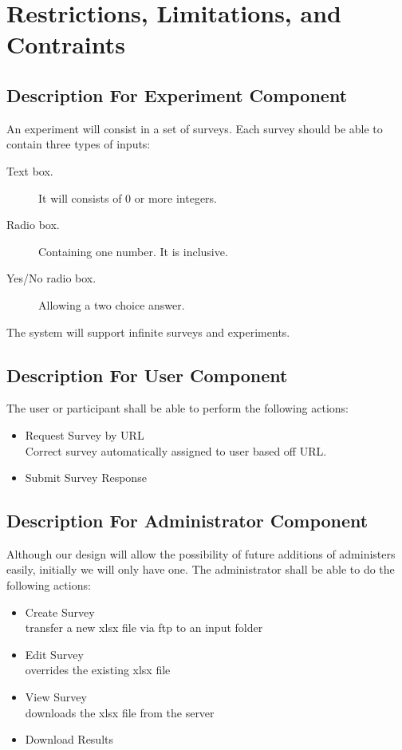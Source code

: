 \documentclass[a4paper,12pt,oneside]{report}
\begin{document}
\chapter{ Restrictions, Limitations, and Contraints}

\section{ Description For Experiment Component}
An experiment will consist in a set of surveys. Each survey should be able to contain three types of inputs:
\begin{description}
\item [Text box.] It will consists of 0 or more integers.
\item [Radio box.] Containing one number. It is inclusive.
\item  [Yes/No radio box.] Allowing a two choice answer.
\end{description}
The system will support infinite surveys and experiments.

\section{ Description For User Component}

The user or participant shall be able to perform the following actions:
\begin{itemize}
	\item Request Survey by URL \\ Correct survey automatically assigned to user based off URL.
	\item Submit Survey Response
\end{itemize}
\section{  Description For Administrator Component}

Although our design will allow the possibility of future additions of administers easily, initially we will only have one. The administrator shall be able to do the following actions:
\begin{itemize}
	\item Create Survey \\ transfer a new xlsx file via ftp to an input folder
	\item Edit Survey \\ overrides the existing xlsx file
	\item View Survey \\ downloads the xlsx file from the server
	\item Download Results 
\end{itemize}
\end{document}
